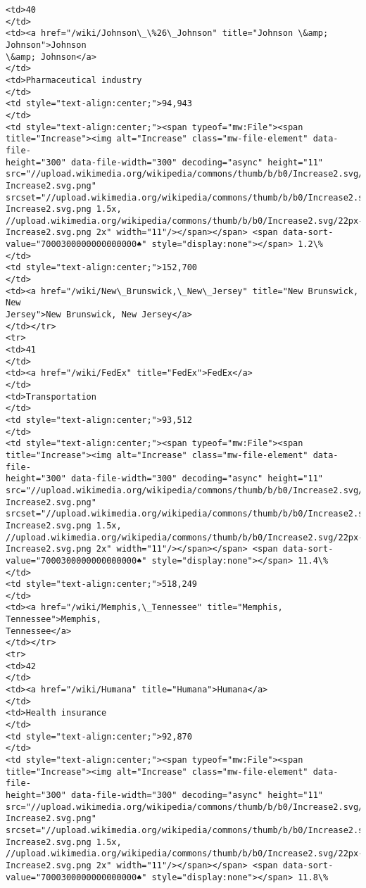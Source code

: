 \documentclass[11pt]{article}
\begin{document}
\begin{Verbatim}[commandchars=\\\{\}]
<td>40
</td>
<td><a href="/wiki/Johnson\_\%26\_Johnson" title="Johnson \&amp; Johnson">Johnson
\&amp; Johnson</a>
</td>
<td>Pharmaceutical industry
</td>
<td style="text-align:center;">94,943
</td>
<td style="text-align:center;"><span typeof="mw:File"><span
title="Increase"><img alt="Increase" class="mw-file-element" data-file-
height="300" data-file-width="300" decoding="async" height="11"
src="//upload.wikimedia.org/wikipedia/commons/thumb/b/b0/Increase2.svg/11px-
Increase2.svg.png"
srcset="//upload.wikimedia.org/wikipedia/commons/thumb/b/b0/Increase2.svg/17px-
Increase2.svg.png 1.5x,
//upload.wikimedia.org/wikipedia/commons/thumb/b/b0/Increase2.svg/22px-
Increase2.svg.png 2x" width="11"/></span></span> <span data-sort-
value="7000300000000000000♠" style="display:none"></span> 1.2\%
</td>
<td style="text-align:center;">152,700
</td>
<td><a href="/wiki/New\_Brunswick,\_New\_Jersey" title="New Brunswick, New
Jersey">New Brunswick, New Jersey</a>
</td></tr>
<tr>
<td>41
</td>
<td><a href="/wiki/FedEx" title="FedEx">FedEx</a>
</td>
<td>Transportation
</td>
<td style="text-align:center;">93,512
</td>
<td style="text-align:center;"><span typeof="mw:File"><span
title="Increase"><img alt="Increase" class="mw-file-element" data-file-
height="300" data-file-width="300" decoding="async" height="11"
src="//upload.wikimedia.org/wikipedia/commons/thumb/b/b0/Increase2.svg/11px-
Increase2.svg.png"
srcset="//upload.wikimedia.org/wikipedia/commons/thumb/b/b0/Increase2.svg/17px-
Increase2.svg.png 1.5x,
//upload.wikimedia.org/wikipedia/commons/thumb/b/b0/Increase2.svg/22px-
Increase2.svg.png 2x" width="11"/></span></span> <span data-sort-
value="7000300000000000000♠" style="display:none"></span> 11.4\%
</td>
<td style="text-align:center;">518,249
</td>
<td><a href="/wiki/Memphis,\_Tennessee" title="Memphis, Tennessee">Memphis,
Tennessee</a>
</td></tr>
<tr>
<td>42
</td>
<td><a href="/wiki/Humana" title="Humana">Humana</a>
</td>
<td>Health insurance
</td>
<td style="text-align:center;">92,870
</td>
<td style="text-align:center;"><span typeof="mw:File"><span
title="Increase"><img alt="Increase" class="mw-file-element" data-file-
height="300" data-file-width="300" decoding="async" height="11"
src="//upload.wikimedia.org/wikipedia/commons/thumb/b/b0/Increase2.svg/11px-
Increase2.svg.png"
srcset="//upload.wikimedia.org/wikipedia/commons/thumb/b/b0/Increase2.svg/17px-
Increase2.svg.png 1.5x,
//upload.wikimedia.org/wikipedia/commons/thumb/b/b0/Increase2.svg/22px-
Increase2.svg.png 2x" width="11"/></span></span> <span data-sort-
value="7000300000000000000♠" style="display:none"></span> 11.8\%

\end{Verbatim}
\end{document}
